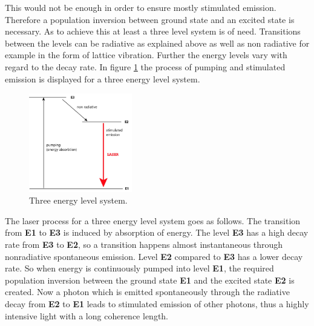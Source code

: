 This would not be enough in order to ensure mostly stimulated emission.
Therefore a population inversion
between ground state and an excited
state is necessary. As to achieve this at least
a three level system is of need.
Transitions between the levels can be radiative as explained above
as well as non radiative for example in the form of lattice vibration.
Further the energy levels vary with regard
to the decay rate. In figure \ref{fig:3_n} the process of pumping and stimulated emission
is displayed for a three energy level system.
\begin{figure}
  \centering
  \includegraphics[width=0.4\textwidth]{Laser_3_Niveau.jpg}
  \caption{Three energy level system.}
  \label{fig:3_n}
\end{figure}
The laser process for a three energy level system
goes as follows.
The transition from \textbf{E1} to \textbf{E3} is induced
by absorption of energy.
The level \textbf{E3} has a high
decay rate from \textbf{E3} to \textbf{E2},
so a transition happens almost instantaneous
through nonradiative spontaneous emission.
Level \textbf{E2} compared to \textbf{E3}
has a lower decay rate.
So when energy is continuously
pumped into level \textbf{E1},
the required population inversion
between the ground state \textbf{E1} and the
excited state \textbf{E2} is created.
Now a photon which is emitted spontaneously
through the radiative decay from
\textbf{E2} to \textbf{E1}
leads to
stimulated emission of other photons,
thus a highly intensive
light with a long coherence length.

